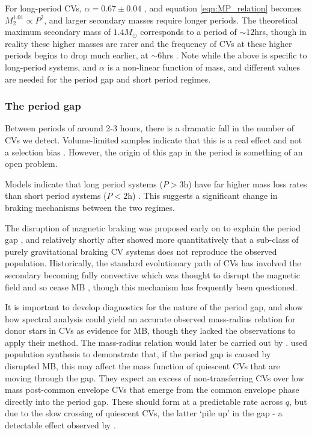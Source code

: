 For long-period CVs, $\alpha = 0.67\pm0.04$ \citep{knigge11}, and equation \ref{eqn:MP_relation} becomes $M_2^{1.01} \propto P^{2}$, and larger secondary masses require longer periods. The theoretical maximum secondary mass of $1.4 M_{\odot}$ corresponds to a period of $\sim12$hrs, though in reality these higher masses are rarer and the frequency of CVs at these higher periods begins to drop much earlier, at $\sim6$hrs \citep{gaensicke2009}. Note while the above is specific to long-period systems, and $\alpha$ is a non-linear function of mass, and different values are needed for the period gap and short period regimes.


\subsubsection{The period gap}
\label{sect:introduction:period gap}

Between periods of around 2-3 hours, there is a dramatic fall in the number of CVs we detect. Volume-limited samples indicate that this is a real effect and not a selection bias \citep{Kolb1998}. However, the origin of this gap in the period is something of an open problem.

Models indicate that long period systems ($P > 3$h) have far higher mass loss rates than short period systems ($P < 2$h) \citep{ritter1985}. This suggests a significant change in braking mechanisms between the two regimes. 

The disruption of magnetic braking was proposed early on to explain the period gap \citep{rappaport1983, spruit1983}, and relatively shortly after \citet{kolb1993} showed more quantitatively that a sub-class of purely gravitational braking CV systems does not reproduce the observed population. 
Historically, the standard evolutionary path of CVs has involved the secondary becoming fully convective which was thought to disrupt the magnetic field and so cease MB \citep{knigge11}, though this mechanism has frequently been questioned. 

It is important to develop diagnostics for the nature of the period gap, and \citet{smith1998} show how spectral analysis could yield an accurate observed mass-radius relation for donor stars in CVs as evidence for MB, though they lacked the observations to apply their method. The mass-radius relation would later be carried out by \citet{knigge11}.
\citet{Davis2008} used population synthesis to demonstrate that, if the period gap is caused by disrupted MB, this may affect the mass function of quiescent CVs that are moving through the gap. They expect an excess of non-transferring CVs over low mass post-common envelope CVs that emerge from the common envelope phase directly into the period gap. These should form at a predictable rate across $q$, but due to the slow crossing of quiescent CVs, the latter `pile up' in the gap - a detectable effect observed by \citet{zorotovic2011}.

